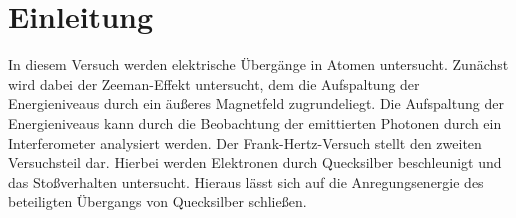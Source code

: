 \section{Einleitung}
In diesem Versuch werden elektrische Übergänge in Atomen untersucht. Zunächst wird dabei der Zeeman-Effekt untersucht, dem die Aufspaltung der Energieniveaus durch ein äußeres Magnetfeld zugrundeliegt. Die Aufspaltung der Energieniveaus kann durch die Beobachtung der emittierten Photonen durch ein Interferometer analysiert werden. Der Frank-Hertz-Versuch stellt den zweiten Versuchsteil dar. Hierbei werden Elektronen durch Quecksilber beschleunigt und das Stoßverhalten untersucht. Hieraus lässt sich auf die Anregungsenergie des beteiligten Übergangs von Quecksilber schließen.
